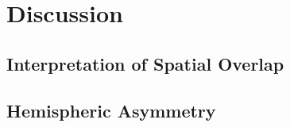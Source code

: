 
\chapter{Discussion}
\label{ch:discussion}

\section{Interpretation of Spatial Overlap}
\label{sec:discussion-dice}


\section{Hemispheric Asymmetry}
\label{sec:discussion-asymmetry}


